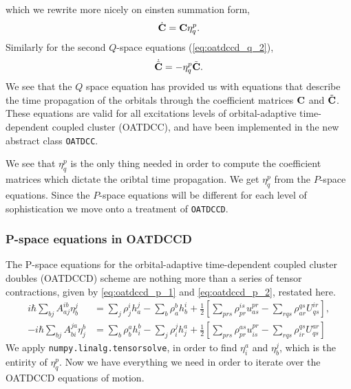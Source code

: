    which we rewrite more nicely on einsten summation form,
    \begin{equation}
        \dot{\vb{C}} = \vb{C}\eta^p_q.
    \end{equation}
    Similarly for the second $Q$-space equations (\autoref{eq:oatdccd_q_2}),
    \begin{equation}
       \dot{\tilde{\vb{C}}} = -\eta^p_q\tilde{\vb{C}}.
    \end{equation}
    We see that the $Q$ space equation has provided us with equations that 
    describe the time propagation of the orbitals through the coefficient 
    matrices $\vb{C}$ and $\tilde{\vb{C}}$. These equations are valid 
    for all excitations levels of orbital-adaptive time-dependent coupled cluster
    (OATDCC), and have been implemented 
    in the new abstract class \lstinline{OATDCC}.

    We see that $\eta^p_q$ is the only thing needed in order to compute the 
    coefficient matrices which dictate the oribtal time propagation. We get $\eta^p_q$
    from the $P$-space equations. Since the $P$-space equations will be different for 
    each level of sophistication we move onto a treatment of \lstinline{OATDCCD}.

    \subsubsection{P-space equations in OATDCCD} 

    The P-space equations for the orbital-adaptive time-dependent coupled cluster 
    doubles (OATDCCD) scheme are nothing more than a series of tensor contractions,
    given by \autoref{eq:oatdccd_p_1} and \autoref{eq:oatdccd_p_2}, restated here.
    \begin{align*}
    i\hbar\sum_{bj}A^{ib}_{aj} \eta^j_b
        &= \sum_j \rho^i_j h^j_a - \sum_b \rho^b_a h^i_b
        + \frac{1}{2}\left[
             \sum_{prs}\rho^{is}_{pr} u^{pr}_{as}
            -\sum_{rqs}\rho^{qs}_{ar} U^{ir}_{qs}
        \right], \\
    -i\hbar\sum_{bj}A^{ja}_{bi} \eta^b_j
        &= \sum_b \rho^a_b h^b_i - \sum_j \rho^j_i h^a_j
        + \frac{1}{2}\left[
             \sum_{prs}\rho^{as}_{pr} u^{pr}_{is}
            -\sum_{rqs}\rho^{qs}_{ir} U^{ar}_{qs}       
        \right]
    \end{align*}
    We apply \lstinline{numpy.linalg.tensorsolve}, in order to find $\eta^a_i$ and 
    $\eta^j_b$, which is the entirity of $\eta^p_q$.
    Now we have everything we need in order to iterate over the OATDCCD equations of 
    motion.

